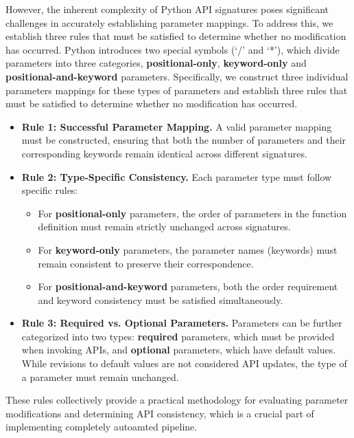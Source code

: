 However, the inherent complexity of Python API signatures poses significant challenges in accurately establishing parameter mappings.
To address this, we establish three rules that must be satisfied to determine whether no modification has occurred.
Python introduces two special symbols (`/' and `*'), which divide parameters into three categories, \textbf{positional-only}, \textbf{keyword-only} and \textbf{positional-and-keyword} parameters. 
Specifically, we construct three individual parameters mappings for these types of parameters and establish three rules that must be satisfied to determine whether no modification has occurred.
\vspace{-10pt} 
\begin{itemize}[leftmargin=4mm, noitemsep]
    \item \textbf{Rule 1: Successful Parameter Mapping.} A valid parameter mapping must be constructed, ensuring that both the number of parameters and their corresponding keywords remain identical across different signatures.

    \item \textbf{Rule 2: Type-Specific Consistency.} Each parameter type must follow specific rules:
    \begin{itemize}
        \item For \textbf{positional-only} parameters, the order of parameters in the function definition must remain strictly unchanged across signatures.
        \item For \textbf{keyword-only} parameters, the parameter names (keywords) must remain consistent to preserve their correspondence.
        \item For \textbf{positional-and-keyword} parameters, both the order requirement and keyword consistency must be satisfied simultaneously.
    \end{itemize}
    \item \textbf{Rule 3: Required vs. Optional Parameters.} Parameters can be further categorized into two types: \textbf{required} parameters, which must be provided when invoking APIs, and \textbf{optional} parameters, which have default values. While revisions to default values are not considered API updates, the type of a parameter must remain unchanged.
\end{itemize}
\vspace{-10pt} 
These rules collectively provide a practical methodology for evaluating parameter modifications and determining API consistency, which is a crucial part of \method implementing completely autoamted pipeline.

